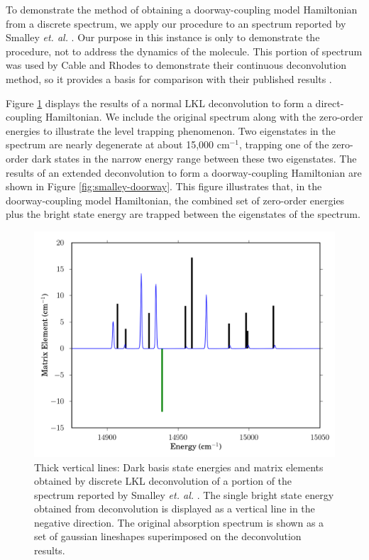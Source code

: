 To demonstrate the method of obtaining a doorway-coupling model
Hamiltonian from a discrete spectrum, we apply our procedure to an
 spectrum reported by Smalley \emph{et. al.} \cite{smalley75}.
Our purpose in this instance is only to demonstrate the procedure, not
to address the dynamics of the  molecule. This portion of
spectrum was used by Cable and Rhodes to demonstrate their continuous
deconvolution method, so it provides a basis for comparison with their
published results \cite{cable80}.

Figure \ref{fig:smalley-direct} displays the results of a normal LKL
deconvolution to form a direct-coupling Hamiltonian.  We include the
original spectrum along with the zero-order energies to illustrate the
level trapping phenomenon.  Two eigenstates in the spectrum are nearly
degenerate at about 15,000 cm$^{-1}$, trapping one of the zero-order
dark states in the narrow energy range between these two eigenstates.
The results of an extended deconvolution to form a doorway-coupling
Hamiltonian are shown in Figure \ref{fig:smalley-doorway}.  This
figure illustrates that, in the doorway-coupling model Hamiltonian,
the combined set of zero-order energies plus the bright state energy
are trapped between the eigenstates of the spectrum.

\begin{figure}
  \caption{Thick vertical lines: Dark basis state energies and matrix
    elements obtained by discrete LKL deconvolution of a portion of
    the  spectrum reported by Smalley \emph{et. al.}
    \cite{smalley75}.  The single bright state energy obtained from
    deconvolution is displayed as a vertical line in the negative
    direction.  The original absorption spectrum is shown as a set of
    gaussian lineshapes superimposed on the deconvolution results.}
  \label{fig:smalley-direct}
  \centering
  \includegraphics[width=6in]{smalley-direct.png}
\end{figure}

